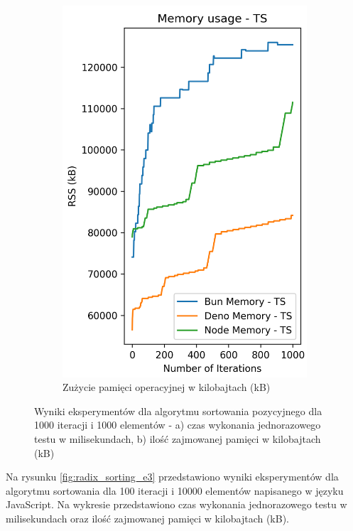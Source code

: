\begin{figure}[H]
\begin{subfigure}[b]{0.4\textwidth}
    \includegraphics[width=\textwidth]{Figures/sorting/sorting_radix_1000_1000_ts_memory.png}
    \caption{Zużycie pamięci operacyjnej w kilobajtach (kB)}
    \label{fig:radix_sorting_e2_ts_memory}
  \end{subfigure}
  \caption{Wyniki eksperymentów dla algorytmu sortowania pozycyjnego dla 1000 iteracji i 1000 elementów - a) czas wykonania jednorazowego testu w milisekundach, b) ilość zajmowanej pamięci w kilobajtach (kB)}
  \label{fig:radix_sorting_e2_ts}
\end{figure}

Na rysunku \ref{fig:radix_sorting_e3} przedstawiono wyniki eksperymentów dla algorytmu sortowania dla 100 iteracji i 10000 elementów napisanego w języku JavaScript. Na wykresie przedstawiono czas wykonania jednorazowego testu w milisekundach oraz ilość zajmowanej pamięci w kilobajtach (kB).


